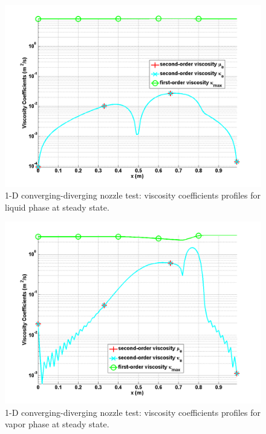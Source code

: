 \begin{figure}[H]
\centering
\includegraphics[width=\textwidth]{figures/SEM/Aint1e4_liquid_viscosity_kappa_mu.png}
\caption{1-D converging-diverging nozzle test: viscosity coefficients profiles for liquid phase at steady state.}
\label{fig:two-fluids-rel-nozzle-visc-liq-sem-sect4}
\end{figure}
%
\begin{figure}[H]
\centering
\includegraphics[width=\textwidth]{figures/SEM/Aint1e4_vapor_viscosity_kappa_mu.png}
\caption{1-D converging-diverging nozzle test: viscosity coefficients profiles for vapor phase at steady state.}
\label{fig:two-fluids-rel-nozzle-visc-vap-sem-sect4}
\end{figure}
%
